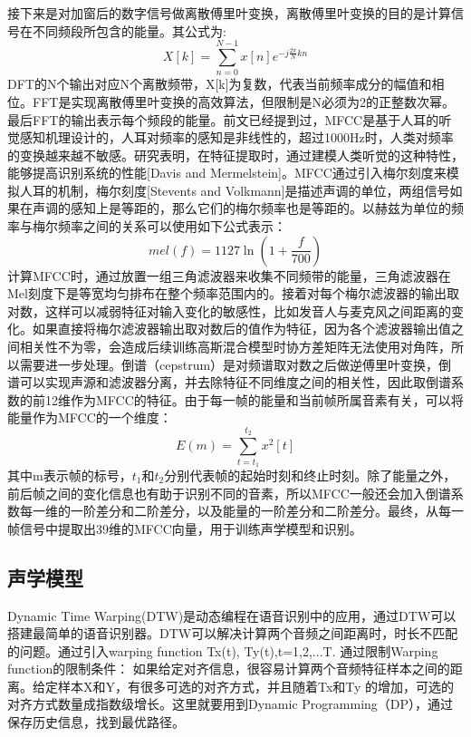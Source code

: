 接下来是对加窗后的数字信号做离散傅里叶变换，离散傅里叶变换的目的是计算信号在不同频段所包含的能量。其公式为:\begin{equation}X[k]=\sum_{n=0}^{N-1} x[n]{e^{-j\frac{2\pi}{N}k{n}}}\end{equation}DFT的N个输出对应N个离散频带，X[k]为复数，代表当前频率成分的幅值和相位。FFT是实现离散傅里叶变换的高效算法，但限制是N必须为2的正整数次幂。最后FFT的输出表示每个频段的能量。前文已经提到过，MFCC是基于人耳的听觉感知机理设计的，人耳对频率的感知是非线性的，超过1000Hz时，人类对频率的变换越来越不敏感。研究表明，在特征提取时，通过建模人类听觉的这种特性，能够提高识别系统的性能[Davis and Mermelstein]。MFCC通过引入梅尔刻度来模拟人耳的机制，梅尔刻度[Stevents and Volkmann]是描述声调的单位，两组信号如果在声调的感知上是等距的，那么它们的梅尔频率也是等距的。以赫兹为单位的频率与梅尔频率之间的关系可以使用如下公式表示：\begin{equation}mel(f)=1127\ln(1+\frac{f}{700})\end{equation}计算MFCC时，通过放置一组三角滤波器来收集不同频带的能量，三角滤波器在Mel刻度下是等宽均匀排布在整个频率范围内的。接着对每个梅尔滤波器的输出取对数，这样可以减弱特征对输入变化的敏感性，比如发音人与麦克风之间距离的变化。如果直接将梅尔滤波器输出取对数后的值作为特征，因为各个滤波器输出值之间相关性不为零，会造成后续训练高斯混合模型时协方差矩阵无法使用对角阵，所以需要进一步处理。倒谱（cepstrum）是对频谱取对数之后做逆傅里叶变换，倒谱可以实现声源和滤波器分离，并去除特征不同维度之间的相关性，因此取倒谱系数的前12维作为MFCC的特征。由于每一帧的能量和当前帧所属音素有关，可以将能量作为MFCC的一个维度：\begin{equation}E(m) = \sum_{t=t_1}^{t_2} x^2[t]\end{equation}
其中m表示帧的标号，$t_1$和$t_2$分别代表帧的起始时刻和终止时刻。除了能量之外，前后帧之间的变化信息也有助于识别不同的音素，所以MFCC一般还会加入倒谱系数每一维的一阶差分和二阶差分，以及能量的一阶差分和二阶差分。最终，从每一帧信号中提取出39维的MFCC向量，用于训练声学模型和识别。


\subsection{声学模型}

Dynamic Time Warping(DTW)是动态编程在语音识别中的应用，通过DTW可以搭建最简单的语音识别器。DTW可以解决计算两个音频之间距离时，时长不匹配的问题。通过引入warping function Tx(t), Ty(t),t=1,2,...T. 通过限制Warping function的限制条件：
如果给定对齐信息，很容易计算两个音频特征样本之间的距离。给定样本X和Y，有很多可选的对齐方式，并且随着Tx和Ty 的增加，可选的对齐方式数量成指数级增长。这里就要用到Dynamic Programming（DP），通过保存历史信息，找到最优路径。

